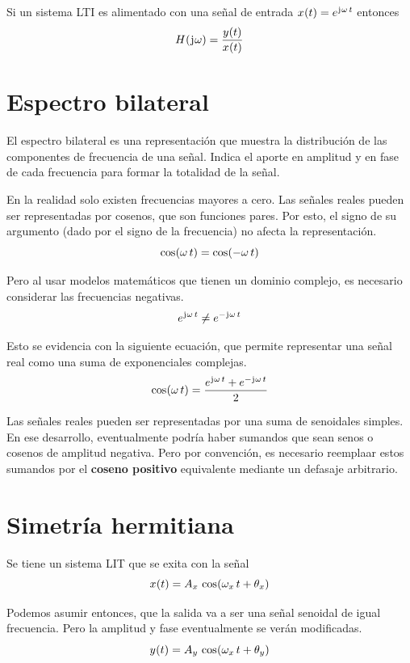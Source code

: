 \begin{mdframed}[style=PropertyFrame]
    \begin{prop}
        \label{prop:funcionDeTransferencia}
    \end{prop}
    Si un sistema LTI es alimentado con una señal de entrada $\fx[x]{t} = e^{\iu \omega \, t}$ entonces
    \[
        \fx[H]{\iu \omega} = \frac{\fx[y]{t}}{\fx[x]{t}}
    \]
\end{mdframed}

\section{Espectro bilateral}

El espectro bilateral es una representación que muestra la distribución de las componentes de frecuencia de una señal.
Indica el aporte en amplitud y en fase de cada frecuencia para formar la totalidad de la señal.

En la realidad solo existen frecuencias mayores a cero.
Las señales reales pueden ser representadas por cosenos, que son funciones pares.
Por esto, el signo de su argumento (dado por el signo de la frecuencia) no afecta la representación.
\[
    \fx[\cos]{\omega \, t} = \fx[\cos]{- \omega \, t}
\]

Pero al usar modelos matemáticos que tienen un dominio complejo, es necesario considerar las frecuencias negativas.
\[
    e^{\iu \omega \, t} \neq e^{- \iu \omega \, t}
\]

Esto se evidencia con la siguiente ecuación, que permite representar una señal real como una suma de exponenciales complejas.
\[
    \fx[\cos]{\omega \, t} = \frac{e^{\iu \omega \, t} + e^{- \iu \omega \, t}}{2}
\]

Las señales reales pueden ser representadas por una suma de senoidales simples.
En ese desarrollo, eventualmente podría haber sumandos que sean senos o cosenos de amplitud negativa.
Pero por convención, es necesario reemplaar estos sumandos por el \textbf{coseno positivo} equivalente mediante un defasaje arbitrario.

\section{Simetría hermitiana}

Se tiene un sistema LIT que se exita con la señal
\[
    \fx[x]{t} = A_x \, \fx[\cos]{\omega_x \, t + \theta_x}
\]

Podemos asumir entonces, que la salida va a ser una señal senoidal de igual frecuencia.
Pero la amplitud y fase eventualmente se verán modificadas.
\[
    \fx[y]{t} = A_y \, \fx[\cos]{\omega_x \, t + \theta_y}
\]


